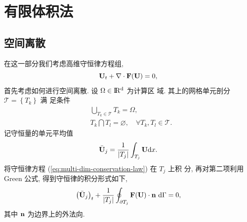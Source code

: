 
\section{有限体积法}
\label{sec:fvm-discrect}
\subsection{空间离散}
\label{sec:semi-descrete-form}
在这一部分我们考虑高维守恒律方程组,
\begin{equation}
  \label{eq:multi-dim-conservation-law}
  {\bf{U}}_{t} + \nabla \cdot {\bf{F}}({\bf{U}}) = 0,
\end{equation}
首先考虑如何进行空间离散. 设 $\Omega \in \rm I\!R^{d}$ 为计算区
域. 其上的网格单元剖分 $\mathcal{T} = \left\{ T_{k} \right\}$ 满
足条件
\begin{equation}
  \label{eq:region-decomposition}
  \begin{aligned}
    &\bigcup_{T_{k}\in \mathcal{T}} {T}_{k} = {\Omega},\\
    &T_{k} \bigcap T_{l} = \varnothing, \quad \forall T_{k},T_{l} \in \mathcal{T}.
  \end{aligned}
\end{equation}
记守恒量的单元平均值
\begin{equation}
  \label{eq:average-fvm}
  \bar{{\bf{U}}}_{j} = \frac{1}{\vert T_{j} \vert} \int_{T_{j}}
  {\bf{U}} \mathrm{d} x.
\end{equation}
将守恒律方程 (\ref{eq:multi-dim-conservation-law}) 在 $T_{j}$ 上积
分, 再对第二项利用 Green 公式, 得到守恒律的积分形式如下,
\begin{equation}
  \label{eq:conservation-law-integral-form}
  \left( \bar{{\bf{U}}}_{j} \right)_{t} + \frac{1}{\vert T_{j} \vert} \oint_{\partial T_{j}}
  {\bf{F}}({\bf{U}}) \cdot {\bf{n}}~ \mathrm{d} \Gamma = 0,
\end{equation}
其中 ${\bf{n}}$ 为边界上的外法向.
